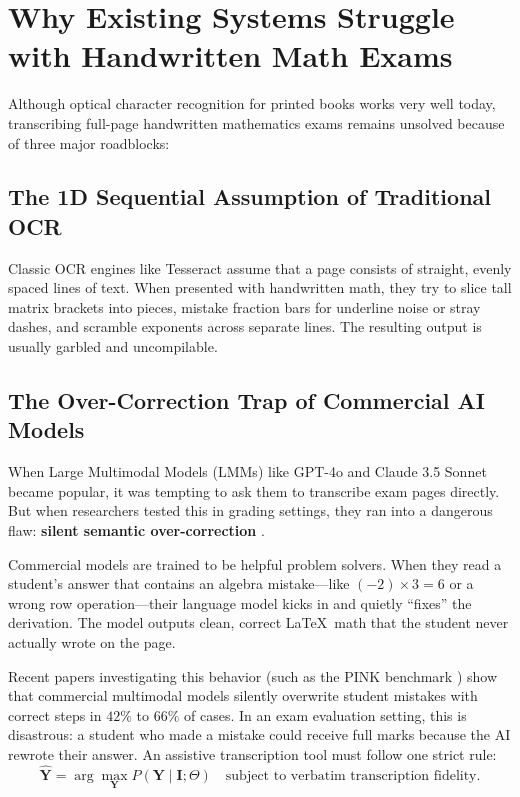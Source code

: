 \section{Why Existing Systems Struggle with Handwritten Math Exams}
\label{sec:failure_modes}

Although optical character recognition for printed books works very well today, transcribing full-page handwritten mathematics exams remains unsolved because of three major roadblocks:

\subsection{The 1D Sequential Assumption of Traditional OCR}
Classic OCR engines like Tesseract \cite{smith2007overview} assume that a page consists of straight, evenly spaced lines of text. When presented with handwritten math, they try to slice tall matrix brackets into pieces, mistake fraction bars for underline noise or stray dashes, and scramble exponents across separate lines. The resulting output is usually garbled and uncompilable.

\subsection{The Over-Correction Trap of Commercial AI Models}
When Large Multimodal Models (LMMs) like GPT-4o and Claude 3.5 Sonnet became popular, it was tempting to ask them to transcribe exam pages directly. But when researchers tested this in grading settings, they ran into a dangerous flaw: \textbf{silent semantic over-correction} \cite{chen2024hallucination, pink2026overcorrection}.

Commercial models are trained to be helpful problem solvers. When they read a student's answer that contains an algebra mistake---like $(-2) \times 3 = 6$ or a wrong row operation---their language model kicks in and quietly ``fixes'' the derivation. The model outputs clean, correct \LaTeX\ math that the student never actually wrote on the page.

Recent papers investigating this behavior (such as the PINK benchmark \cite{pink2026overcorrection}) show that commercial multimodal models silently overwrite student mistakes with correct steps in $42\%$ to $66\%$ of cases. In an exam evaluation setting, this is disastrous: a student who made a mistake could receive full marks because the AI rewrote their answer. An assistive transcription tool must follow one strict rule:
\begin{equation}
\label{eq:fidelity_invariant}
\hat{\mathbf{Y}} = \arg\max_{\mathbf{Y}} P(\mathbf{Y} \mid \mathbf{I}; \Theta) \quad \text{subject to verbatim transcription fidelity.}
\end{equation}

